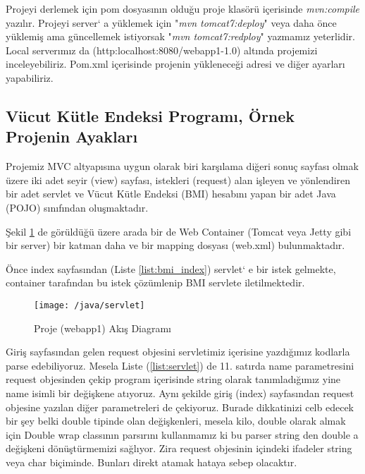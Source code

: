 
Projeyi derlemek için pom dosyasının olduğu proje klasörü içerisinde \emph{mvn:compile} yazılır.
Projeyi server` a yüklemek için "\emph{mvn tomcat7:deploy}" veya daha önce yüklemiş ama güncellemek istiyorsak "\emph{mvn tomcat7:redploy}" yazmamız yeterlidir. Local serverımız da (http:localhost:8080/webapp1-1.0) altında projemizi inceleyebiliriz. Pom.xml içerisinde projenin yükleneceği adresi ve diğer ayarları yapabiliriz.

\subsection{Vücut Kütle Endeksi Programı, Örnek Projenin Ayakları}
Projemiz  MVC altyapısına uygun olarak biri karşılama diğeri sonuç sayfası olmak üzere iki adet seyir (view) sayfası, istekleri (request) alan işleyen ve yönlendiren bir adet servlet ve Vücut Kütle Endeksi (BMI) hesabını yapan bir adet Java (POJO) sınıfından oluşmaktadır. 

Şekil \ref{fig:servletAkis} de görüldüğü üzere arada bir de Web Container (Tomcat veya Jetty gibi bir server) bir katman daha ve bir mapping dosyası (web.xml) bulunmaktadır. 

Önce index sayfasından (Liste \ref{list:bmi_index}) servlet` e bir istek gelmekte, container tarafından bu istek çözümlenip BMI servlete iletilmektedir.
\begin{figure}[h]
\centering\texttt{[image: /java/servlet]}
\caption{Proje (webapp1) Akış Diagramı}
\label{fig:servletAkis}
\end{figure}


Giriş sayfasından gelen request objesini servletimiz içerisine yazdığımız kodlarla parse edebiliyoruz. Mesela Liste (\ref{list:servlet}) de 11. satırda name parametresini request objesinden çekip program içerisinde string olarak tanımladığımız yine name isimli bir değişkene atıyoruz. Aynı şekilde giriş (index) sayfasından request objesine yazılan diğer parametreleri de çekiyoruz. Burade dikkatinizi celb edecek bir şey belki double tipinde olan değişkenleri, mesela kilo, double olarak almak için Double wrap classının parsırını kullanmamız ki bu parser string den double a değişkeni dönüştürmemizi sağlıyor. Zira request objesinin içindeki ifadeler string veya char biçiminde. Bunları direkt atamak hataya sebep olacaktır.  

